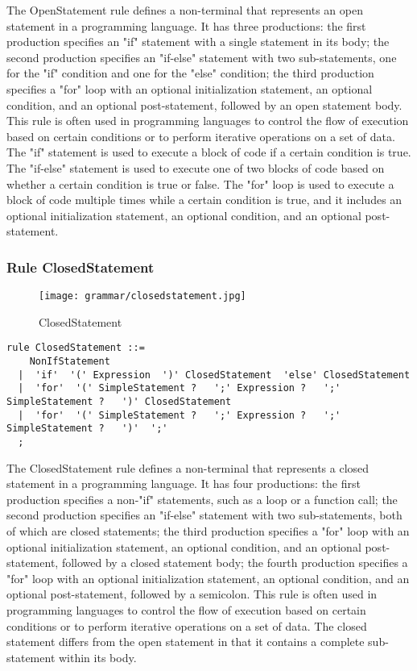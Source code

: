 The OpenStatement rule defines a non-terminal that represents an open statement in a programming language. It has three productions: the first production specifies an "if" statement with a single statement in its body; the second production specifies an "if-else" statement with two sub-statements, one for the "if" condition and one for the "else" condition; the third production specifies a "for" loop with an optional initialization statement, an optional condition, and an optional post-statement, followed by an open statement body. This rule is often used in programming languages to control the flow of execution based on certain conditions or to perform iterative operations on a set of data. The "if" statement is used to execute a block of code if a certain condition is true. The "if-else" statement is used to execute one of two blocks of code based on whether a certain condition is true or false. The "for" loop is used to execute a block of code multiple times while a certain condition is true, and it includes an optional initialization statement, an optional condition, and an optional post-statement.

\subsubsection*{Rule ClosedStatement}

\begin{figure}
\centering
\texttt{[image: grammar/closedstatement.jpg]}
\caption{ClosedStatement}
\end{figure}

\begin{lstlisting}
rule ClosedStatement ::=
    NonIfStatement 
  |  'if'  '(' Expression  ')' ClosedStatement  'else' ClosedStatement 
  |  'for'  '(' SimpleStatement ?   ';' Expression ?   ';' SimpleStatement ?   ')' ClosedStatement 
  |  'for'  '(' SimpleStatement ?   ';' Expression ?   ';' SimpleStatement ?   ')'  ';' 
  ;
\end{lstlisting}

The ClosedStatement rule defines a non-terminal that represents a closed statement in a programming language. It has four productions: the first production specifies a non-"if" statements, such as a loop or a function call; the second production specifies an "if-else" statement with two sub-statements, both of which are closed statements; the third production specifies a "for" loop with an optional initialization statement, an optional condition, and an optional post-statement, followed by a closed statement body; the fourth production specifies a "for" loop with an optional initialization statement, an optional condition, and an optional post-statement, followed by a semicolon. This rule is often used in programming languages to control the flow of execution based on certain conditions or to perform iterative operations on a set of data. The closed statement differs from the open statement in that it contains a complete sub-statement within its body.

